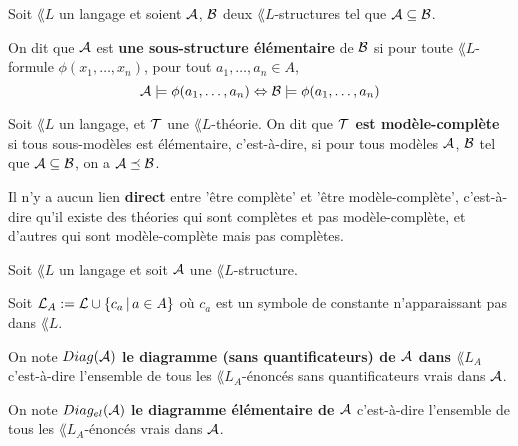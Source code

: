 \documentclass[a4paper, 12pt]{report}
\begin{document}
\begin{definition} 
	Soit $\lang{L}$ un langage et soient $\mathcal{A}$, $\mathcal{B}$ deux
	$\lang{L}$-structures tel que $\mathcal{A} \subseteq \mathcal{B}$.

	On dit que $\mathcal{A}$ est \textbf{une sous-structure élémentaire} de
	$\mathcal{B}$ si pour toute $\lang{L}$-formule $\phi(x_{1}, \dots, x_{n})$,
	pour tout $a_{1}, \dots, a_{n} \in A$,
	\begin{equation}
		\mathcal{A} \models \phi(a_{1}, \dots, a_{n}) \Leftrightarrow \mathcal{B}
		\models \phi(a_{1}, \dots, a_{n})
	\end{equation}
\end{definition}

\begin{definition} 
	Soit $\lang{L}$ un langage, et $\mathcal{T}$ une $\lang{L}$-théorie.
	On dit que \textbf{$\mathcal{T}$ est modèle-complète} si tous sous-modèles
	est élémentaire, c'est-à-dire, si pour tous modèles $\mathcal{A}$,
	$\mathcal{B}$ tel que $\mathcal{A} \subseteq \mathcal{B}$, on a $\mathcal{A}
	\preceq \mathcal{B}$.
\end{definition}

\begin{remarque}
	Il n'y a aucun lien \textbf{direct} entre 'être complète' et 'être
	modèle-complète', c'est-à-dire qu'il existe des théories qui sont complètes
	et pas modèle-complète, et d'autres qui sont modèle-complète mais pas complètes.
\end{remarque}

\begin{definition} 
	Soit $\lang{L}$ un langage et soit $\mathcal{A}$ une $\lang{L}$-structure.

	Soit $\mathcal{L}_{A}:= \mathcal{L} \cup \left\{c_{a} \, | \, a \in A \right\}$ où $c_{a}$
	est un symbole de constante n'apparaissant pas dans $\lang{L}$.

	On note $Diag(\mathcal{A})$ \textbf{le diagramme (sans quantificateurs) de
	$\mathcal{A}$ dans $\lang{L}_{A}$} c'est-à-dire l'ensemble de tous les
	$\lang{L}_{A}$-énoncés sans quantificateurs vrais dans $\mathcal{A}$.

	On note $Diag_{el}(\mathcal{A})$ \textbf{le diagramme élémentaire de
	$\mathcal{A}$} c'est-à-dire l'ensemble de tous les $\lang{L}_{A}$-énoncés
	vrais dans $\mathcal{A}$.
\end{definition}
\end{document}
